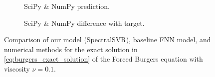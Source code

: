 \documentclass[preprint,12pt,times,authoryear]{elsarticle}
\begin{document}
\begin{figure}[H]
\begin{adjustwidth}{-0.05\linewidth}{-0.05\linewidth}
\begin{subfigure}{0.49\linewidth}
      \begin{adjustbox}{width=\linewidth}
        
      \end{adjustbox}
      \caption{SciPy \& NumPy prediction.}\label{fig:comp_exact_spo_pred_0.1}
    \end{subfigure}
    \begin{subfigure}{0.49\linewidth}
      \begin{adjustbox}{width=\linewidth}
        
      \end{adjustbox}
      \caption{SciPy \& NumPy difference with target.}\label{fig:comp_exact_spo_diff_0.1}
    \end{subfigure}
  \end{adjustwidth}
  \caption{Comparison of our model (SpectralSVR), baseline FNN model, and numerical methods for the exact solution in \cref{eq:burgers_exact_solution} of the Forced Burgers equation with viscosity \(\nu=0.1\).}\label{fig:comparison_burgers_exact_0.1}
\end{figure}
\end{document}
